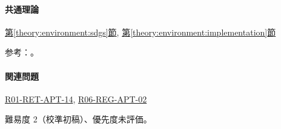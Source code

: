 \paragraph{共通理論} \hyperref[theory:environment:sdgs]{第\ref*{theory:environment:sdgs}節}, \hyperref[theory:environment:implementation]{第\ref*{theory:environment:implementation}節}

\par 参考：\cite{env_sdgs_pamphlet,env_humansecurity}。

\paragraph{関連問題} \hyperref[q:r01-ret-apt-14]{R01-RET-APT-14}, \hyperref[q:r06-reg-apt-02]{R06-REG-APT-02}

\par 難易度 2（校準初稿）、優先度未評価。

